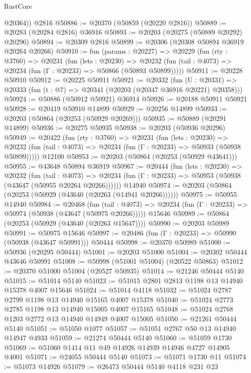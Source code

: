 \begin{lexlean}{RustCore}
\begin{coremodule}
        @20364))
    @2816
@50886 := @20370 (@50859 (@20220 @2816))
@50889 := @20283 (@20284 @2816) @36916
@50893 := @20203 (@20275 (@50889 @20292) @20296)
@50894 := @20309 @2816
@50899 := @20306 (@20308 @50894 @36919 @20264 @20266)
@50910 := fun (params : @20227) =>
  @20229
    (fun (rty : @3760) =>
    @20231
      (fun (lets : @20230) =>
      @20232 (fun (tail : @4073) => @20234 (fun (Γ : @20233) => @50866 (@50893 @50899)))))
@50911 := @20228 @50910
@50912 := @20225 @50911
@50921 := @20332
    (fun (U : @20331) => @20333 (fun (t : @7) => @20341 (@20203 (@20347 @36916 @20221) @20358)))
@50924 := @50886 (@50912 @50921) @36914
@50926 := @20188 @50911 @50921
@50928 := @20419 @50910 @14899
@50929 := @20256 @14899
@50933 := @20203 (@50864 (@20253 (@50929 @20269)))
@50935 := @50889 (@20291 @14899)
@50936 := @20275 @50935
@50938 := @20203 (@50936 @20296)
@50949 := @20422
    (fun (rty : @3760) =>
    @20231
      (fun (lets : @20230) =>
      @20232 (fun (tail : @4073) => @20234 (fun (Γ : @20233) => @50933 (@50938 @50899)))))
    @12100
@50953 := @20203 (@50864 (@20253 (@50929 @43641)))
@50955 := @43648 @50894 @36919
@50967 := @20444
    (fun (lets : @20230) =>
    @20232
      (fun (tail : @4073) =>
      @20234 (fun (Γ : @20233) => @50953 (@50938 (@43647 (@50955 @20264 @20266))))))
    @14940
@50974 := @20203 (@50864 (@20253 (@50929 (@43640 (@20263 (@14941 @20266))))))
@50975 := @50955 @14940
@50984 := @20468
    (fun (tail : @4073) => @20234 (fun (Γ : @20233) => @50974 (@50938 (@43647 (@50975 @20266)))))
    @15646
@50989 := @50864 (@20253 (@50929 (@43640 (@20263 @15647))))
@50990 := @20203 @50989
@50991 := @50975 @15646
@50997 := @20486 (fun (Γ : @20233) => @50990 (@50938 (@43647 @50991))) @50444
@50998 := @20370 @50989
@51000 := @50936 (@20295 @50444)
@51001 := @20203 @51000
@51004 := @20302 @50444 @43646 @50991
@51008 := @50998 (@51001 @51004) (@20522 @50863)
@51012 := @20370 @51000 @51004 (@20527 @50935)
@51014 := @21246 @50444 @5140
@51015 := @51014 @5140
@51023 := @51015 @2801 @2813 @1198 @13 @14940 @15378 @4007 @15646
@51024 := @51014 @4118
@51032 := @51024 @2787 @2799 @1198 @13 @14940 @15165 @4007 @15378
@51040 := @51024 @2773 @2785 @1198 @13 @14940 @15005 @4007 @15165
@51048 := @51024 @2768 @1203 @2772 @13 @14940 @14949 @4007 @15005
@51050 := @21261 @50444 @5140
@51051 := @51050 @1077
@51057 := @51051 @2767 @50 @13 @14940 @14947 @4933
@51059 := @21274 @50444 @5140
@51060 := @51059 @1730
@51069 := @51060 @1414 @11 @49 @14926 @14939 @14946 @4727 @14905 @4001
@51071 := @24055 @50444 @5140
@51073 := @51071 @1730 @11
@51074 := @51073 @14926
@51079 := @26473 @50444 @5140 @4118 @231 @23

\end{coremodule}
\end{lexlean}
